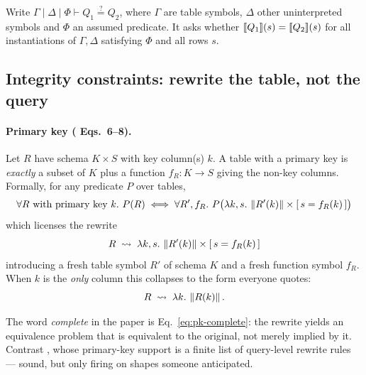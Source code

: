 \begin{definition}
Write $\Gamma\mid\Delta\mid\Phi \vdash Q_1 \stackrel{?}{=} Q_2$, where $\Gamma$ are table
symbols, $\Delta$ other uninterpreted symbols and $\Phi$ an assumed predicate. It asks
whether $[\![ Q_1 ]\!](s)=[\![ Q_2 ]\!](s)$ for all instantiations of $\Gamma,\Delta$ satisfying
$\Phi$ and all rows $s$.
\end{definition}

\subsection{Integrity constraints: rewrite the table, not the query}

\paragraph{Primary key (\cite{qed} Eqs.\ 6--8).}
Let $R$ have schema $K\times S$ with key column(s) $k$. A table with a primary key is
\emph{exactly} a subset of $K$ plus a function $f_R:K\to S$ giving the non-key columns.
Formally, for any predicate $P$ over tables,
\begin{equation}\label{eq:pk-complete}
\forall R \text{ with primary key } k.\ P(R)
\iff \forall R',f_R.\ P\bigl(\lam{k,s}{\sq{R'(k)}\times\ind{s=f_R(k)}}\bigr)
\end{equation}
which licenses the rewrite
\begin{equation}\label{eq:pk7}
R \;\rightsquigarrow\; \lambda k,s.\,\left\lVert R'(k) \right\rVert\times[\,s=f_R(k)\,]
\end{equation}
introducing a fresh table symbol $R'$ of schema $K$ and a fresh function symbol $f_R$.
When $k$ is the \emph{only} column this collapses to the form everyone quotes:
\begin{equation}\label{eq:pk8}
R \;\rightsquigarrow\; \lambda k.\,\left\lVert R(k) \right\rVert.
\end{equation}


The word \emph{complete} in the paper is Eq.~\eqref{eq:pk-complete}: the rewrite yields an
equivalence problem that is equivalent to the original, not merely implied by it. Contrast
\spes{}, whose primary-key support is a finite list of query-level rewrite rules --- sound,
but only firing on shapes someone anticipated.

